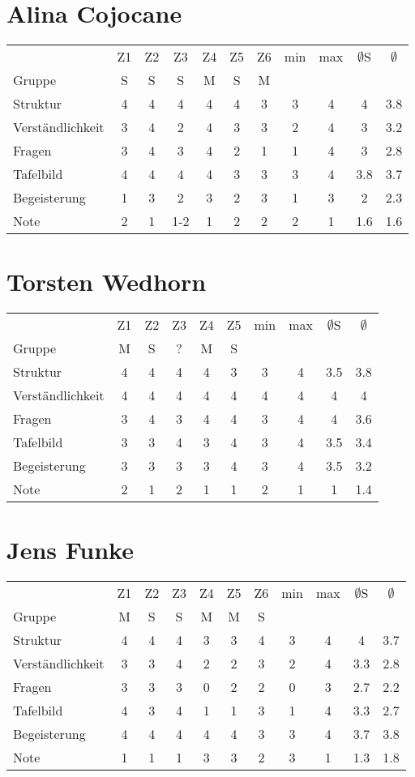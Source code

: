 \documentclass[a4paper]{article}
\begin{document}
\section{Alina Cojocane}
\begin{tabular}{l|cccccc|cc|cc}
&Z1&Z2&Z3&Z4&Z5&Z6&min&max&$\emptyset$S&$\emptyset$\\
Gruppe               &S&S&S&M&S&M&&&&\\
\hline
Struktur             &4&4&4&4&4&3&3&4&4&3.8\\
Verst\"andlichkeit   &3&4&2&4&3&3&2&4&3&3.2\\
Fragen               &3&4&3&4&2&1&1&4&3&2.8\\
Tafelbild            &4&4&4&4&3&3&3&4&3.8&3.7\\
Begeisterung         &1&3&2&3&2&3&1&3&2&2.3\\
\hline
Note                 &2&1&1-2&1&2&2&2&1&1.6&1.6
\end{tabular}


\section{Torsten Wedhorn}
\begin{tabular}{l|ccccc|cc|cc}
&Z1&Z2&Z3&Z4&Z5&min&max&$\emptyset$S&$\emptyset$\\
Gruppe               &M&S&?&M&S&&&&\\
\hline
Struktur             &4&4&4&4&3&3&4&3.5&3.8\\
Verst\"andlichkeit   &4&4&4&4&4&4&4&4&4\\
Fragen               &3&4&3&4&4&3&4&4&3.6\\
Tafelbild            &3&3&4&3&4&3&4&3.5&3.4\\
Begeisterung         &3&3&3&3&4&3&4&3.5&3.2\\
\hline
Note                 &2&1&2&1&1&2&1&1&1.4
\end{tabular}





\section{Jens Funke}
\begin{tabular}{l|cccccc|cc|cc}
&Z1&Z2&Z3&Z4&Z5&Z6&min&max&$\emptyset$S&$\emptyset$\\
Gruppe               &M&S&S&M&M&S&&&&\\
\hline
Struktur             &4&4&4&3&3&4&3&4&4&3.7\\
Verst\"andlichkeit   &3&3&4&2&2&3&2&4&3.3&2.8\\
Fragen               &3&3&3&0&2&2&0&3&2.7&2.2\\
Tafelbild            &4&3&4&1&1&3&1&4&3.3&2.7\\
Begeisterung         &4&4&4&4&4&3&3&4&3.7&3.8\\
\hline
Note                 &1&1&1&3&3&2&3&1&1.3&1.8
\end{tabular}
\end{document}
